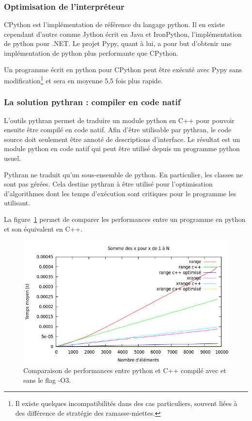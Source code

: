 \documentclass[a4paper]{article}
\begin{document}
\subsubsection{Optimisation de l'interpréteur}

CPython est l'implémentation de référence du langage python. Il en existe cependant d'autre comme Jython écrit en Java et IronPython, l'implémentation de python pour .NET. Le projet Pypy, quant à lui, a pour but d'obtenir une implémentation de python plus performante que CPython.

Un programme écrit en python pour CPython peut être exécuté avec Pypy sans modification\footnote{Il existe quelques incompatibilités dans des cas particuliers, souvent liées à des différence de stratégie des ramasse-miettes\cite{PypyDiff}.} et sera en moyenne 5,5 fois plus rapide\cite{PypySpeed}.

\subsubsection{La solution pythran : compiler en code natif}

L'outils pythran permet de traduire un module python en C++ pour pouvoir ensuite être compilé en code natif. Afin d'être utilisable par pythran, le code source doit seulement être annoté de descriptions d'interface. Le résultat est un module python en code natif qui peut être utilisé depuis un programme python usuel.

Pythran ne traduit qu'un sous-ensemble de python. En particulier, les classes ne sont pas gérées. Cela destine pythran à être utilisé pour l'optimisation d'algorithmes dont les temps d'exécution sont critiques pour le programme les utilisant.

La figure~\ref{RangeXrangePyCpp} permet de comparer les performances entre un programme en python et son équivalent en C++.

\begin{figure}[h]
  \includegraphics[scale=0.5]{./Pictures/RangeXrangePyCpp}
  \caption{Comparaison de performances entre python et C++ compilé avec et sans le flag -O3.}
  \label{RangeXrangePyCpp}
\end{figure}
\end{document}
